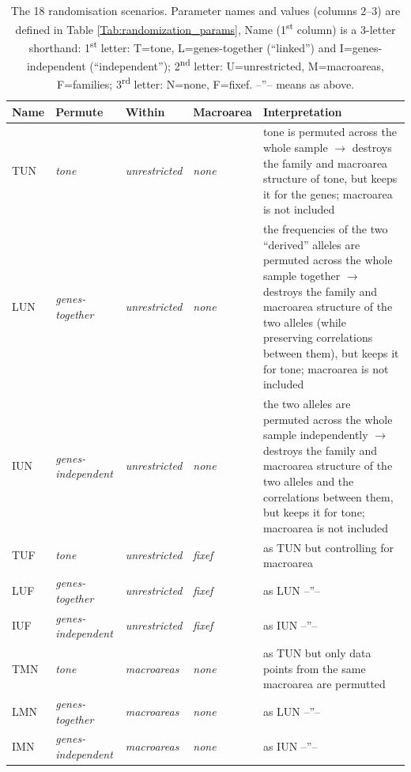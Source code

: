 \documentclass[twoside,onecolumn]{article}
\begin{document}
\begin{table}[h]
  \caption{The 18 randomisation scenarios. Parameter names and values (columns 2--3) are defined in Table \ref{Tab:randomization_params}, Name (1\textsuperscript{st} column) is a 3-letter shorthand: 1\textsuperscript{st} letter: T=tone, L=genes-together (``linked'') and I=genes-independent (``independent''); 2\textsuperscript{nd} letter: U=unrestricted, M=macroareas, F=families; 3\textsuperscript{rd} letter: N=none, F=fixef. --''-- means as above.}
  \label{Tab:randomization_scenarios}
  \centering
  \begin{tabularx}{\textwidth}{|l|l|l|l|X|}
    \toprule
    \textbf{Name} & \textbf{Permute} & \textbf{Within} & \textbf{Macroarea} & \textbf{Interpretation} \\
    \midrule
    TUN & \textit{tone} & \textit{unrestricted} & \textit{none} & tone is permuted across the whole sample $\rightarrow$ destroys the family and macroarea structure of tone, but keeps it for the genes; macroarea is not included \\
    \midrule
    LUN & \textit{genes-together} & \textit{unrestricted} & \textit{none} & the frequencies of the two ``derived'' alleles are permuted across the whole sample together $\rightarrow$ destroys the family and macroarea structure of the two alleles (while preserving correlations between them), but keeps it for tone; macroarea is not included \\
    \midrule
    IUN & \textit{genes-independent} & \textit{unrestricted} & \textit{none} & the two alleles are permuted across the whole sample independently $\rightarrow$ destroys the family and macroarea structure of the two alleles and the correlations between them, but keeps it for tone; macroarea is not included \\
    \midrule
    TUF & \textit{tone} & \textit{unrestricted} & \textit{fixef} & as TUN but controlling for macroarea \\
    LUF & \textit{genes-together} & \textit{unrestricted} & \textit{fixef} & as LUN --''-- \\
    IUF & \textit{genes-independent} & \textit{unrestricted} & \textit{fixef} & as IUN --''-- \\
    \midrule
    TMN & \textit{tone} & \textit{macroareas} & \textit{none} & as TUN but only data points from the same macroarea are permutted \\
    LMN & \textit{genes-together} & \textit{macroareas} & \textit{none} & as LUN --''-- \\
    IMN & \textit{genes-independent} & \textit{macroareas} & \textit{none} & as IUN --''-- \\

\end{tabularx}
\end{table}
\end{document}
